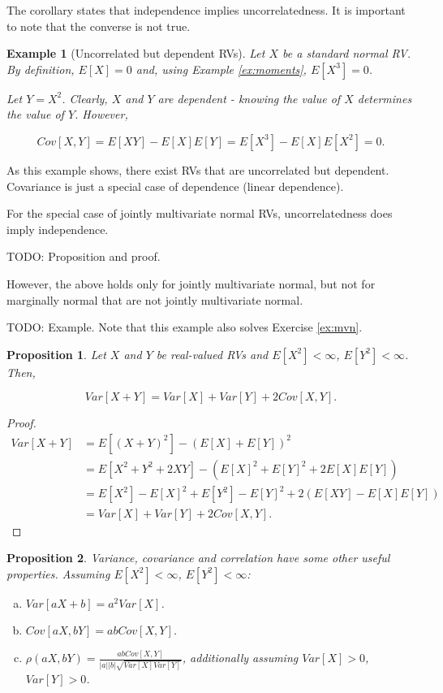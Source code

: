 \documentclass{book}
\theoremstyle{plain}%
\newtheorem{prototheorem}{Example}[section]
\newenvironment{cexample}
   {\colorlet{shadecolor}{gray!10}\begin{shaded}\begin{prototheorem}}
   {\end{prototheorem}\end{shaded}}
\newtheorem{proposition}{Proposition}[section]
\theoremstyle{definition}
\begin{document}
The corollary states that independence implies uncorrelatedness. It is important to note that the converse is not true.

\begin{cexample}[Uncorrelated but dependent RVs]
Let $X$ be a standard normal RV. By definition, $E[X] = 0$ and, using Example \ref{ex:moments}, $E[X^3] = 0$.

Let $Y = X^2$. Clearly, $X$ and $Y$ are dependent - knowing the value of $X$ determines the value of $Y$. However,

$$Cov[X,Y] = E[XY] - E[X]E[Y] = E[X^3] - E[X]E[X^2] = 0.$$
\end{cexample}

As this example shows, there exist RVs that are uncorrelated but dependent. Covariance is just a special case of dependence (linear dependence).

For the special case of jointly multivariate normal RVs, uncorrelatedness does imply independence.

TODO: Proposition and proof.

However, the above holds only for jointly multivariate normal, but not for marginally normal that are not jointly multivariate normal.

TODO: Example. Note that this example also solves Exercise \ref{ex:mvn}.

\begin{proposition}
Let $X$ and $Y$ be real-valued RVs and $E[X^2] < \infty$, $E[Y^2] < \infty$. Then,

$$Var[X+Y] = Var[X] + Var[Y] + 2Cov[X,Y].$$
\end{proposition}

\begin{proof}
\begin{align*}
Var[X+Y] &= E[(X +Y)^2] - (E[X]+ E[Y])^2  \\
&= E[X^2 + Y^2 + 2XY] - (E[X]^2 + E[Y]^2 + 2E[X]E[Y])\\
&= E[X^2] - E[X]^2 + E[Y^2] - E[Y]^2 + 2(E[XY] - E[X]E[Y])\\
&= Var[X] + Var[Y] + 2Cov[X,Y].
\end{align*}
\end{proof}

\begin{proposition}
Variance, covariance and correlation have some other useful properties. Assuming $E[X^2] < \infty$, $E[Y^2] < \infty$:

\begin{enumerate}[(a)]
\item $Var[aX + b] = a^2Var[X]$.
\item $Cov[aX, bY] = abCov[X,Y]$.
\item $\rho(aX, bY) = \frac{abCov[X,Y]}{|a||b|\sqrt{Var[X]Var[Y]}}$, additionally assuming $Var[X] > 0$, $Var[Y] > 0$.
\end{enumerate}\label{prop:variance2}
\end{proposition}
\end{document}
